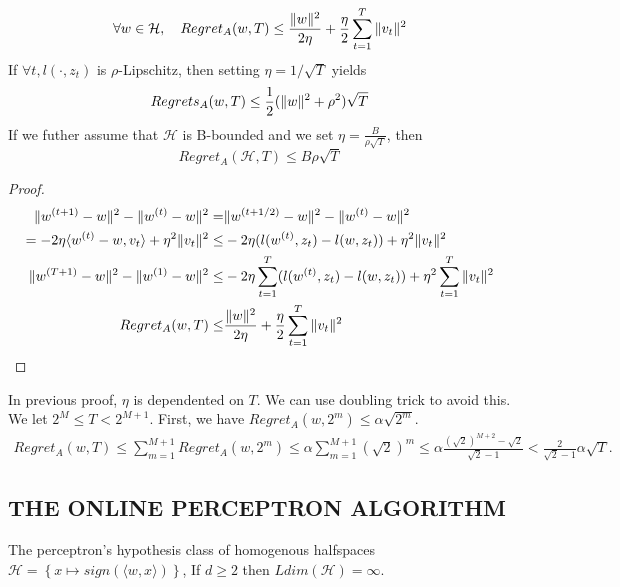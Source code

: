 \begin{theorem}
    \[
        \forall w \in \mathcal{H},\quad Regret_A(w, T) \le \frac{ \Arrowvert w \Arrowvert^2 }{ 2\eta } + \frac{\eta}{2} \sum^{T}_{t=1} \Arrowvert v_t \Arrowvert^2
    \]
    If $ \forall t, l(\cdot, z_t) $ is $ \rho $-Lipschitz, then setting $ \eta = 1/\sqrt{T} $ yields
    \[
        Regrets_A(w, T) \le \frac{1}{2} ( \Arrowvert w \Arrowvert^2 + \rho^2) \sqrt{T}
    \]
    If we futher assume that $ \mathcal{H} $ is B-bounded and we set $ \eta = \frac{B}{\rho \sqrt{T}}  $, then
    \[
        Regret_{A}(\mathcal{H},T) \le B\rho\sqrt{T}
    \]
    \begin{proof}
        \begin{align*}
            \Arrowvert w^{(t+1)} - w \Arrowvert^2 - \Arrowvert w^{(t)} - w \Arrowvert^2
            =& \Arrowvert w^{(t+1/2)} - w \Arrowvert^2 - \Arrowvert w^{(t)} - w \Arrowvert^2\\
            = -2\eta \langle w^{(t)} - w, v_t \rangle + \eta^2 \Arrowvert v_t \Arrowvert^2
            \le& -2\eta (l(w^{(t)}, z_t) - l(w, z_t)) + \eta^2 \Arrowvert v_t \Arrowvert^2\\
            \Arrowvert w^{(T+1)} - w \Arrowvert^2 - \Arrowvert w^{(1)} - w \Arrowvert^2
            \le& -2\eta \sum^{T}_{t=1} (l(w^{(t)}, z_t) - l(w, z_t)) + \eta^2 \sum^{T}_{t=1} \Arrowvert v_t \Arrowvert^2\\
            Regret_A(w, T) \le& \frac{\Arrowvert w \Arrowvert^2 }{2 \eta} + \frac{\eta}{2} \sum^{T}_{t=1} \Arrowvert v_t \Arrowvert^2
        \end{align*}
    \end{proof}
\end{theorem}

In previous proof, $ \eta $ is dependented on $ T $. We can use doubling trick to avoid this.
We let $ 2^M \le T < 2^{M+1} $. First, we have $ Regret_A(w, 2^m) \le \alpha \sqrt{2^m} $.
\begin{align*}
    Regret_A(w, T) \le \sum^{M+1}_{m=1} Regret_A(w, 2^m) \le \alpha \sum^{M+1}_{m=1} {(\sqrt 2)}^m \le \alpha \frac{{(\sqrt 2)}^{M+2} - \sqrt 2}{\sqrt 2 - 1}  < \frac{2}{\sqrt 2 - 1} \alpha \sqrt T.
\end{align*}


\subsection{THE ONLINE PERCEPTRON ALGORITHM}%

The perceptron's hypothesis class of homogenous halfspaces $ \mathcal{H} = \left\{ x \mapsto sign(\langle w, x \rangle) \right\}  $, If $ d \ge 2 $ then $ Ldim(\mathcal{H}) = \infty $.

